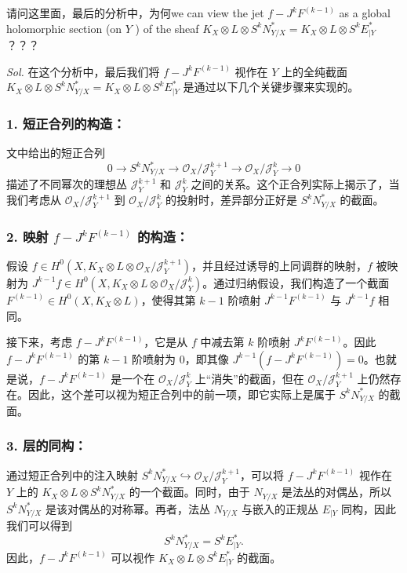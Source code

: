 \documentclass[lang=cn,zihao=5,twoside,fontset=none]{textbook}
\begin{document}
请问这里面，最后的分析中，为何we can view the jet $f-J^k F^{(k-1)}$ as a global holomorphic section (on $Y$ ) of the sheaf $K_X \otimes L \otimes S^k N_{Y / X}^*=K_X \otimes L \otimes S^k E_{\mid Y}^*$？？？

\textit{ Sol. } 在这个分析中，最后我们将 $f - J^k F^{(k-1)}$ 视作在 $Y$ 上的全纯截面 $K_X \otimes L \otimes S^k N_{Y/X}^* = K_X \otimes L \otimes S^k E_{\mid Y}^*$ 是通过以下几个关键步骤来实现的。

\subsubsection{1. 短正合列的构造：}
文中给出的短正合列
\[
0 \longrightarrow S^k N_{Y/X}^* \longrightarrow \mathcal{O}_X / \mathcal{J}_Y^{k+1} \longrightarrow \mathcal{O}_X / \mathcal{J}_Y^k \longrightarrow 0
\]
描述了不同幂次的理想丛 $\mathcal{J}_Y^{k+1}$ 和 $\mathcal{J}_Y^k$ 之间的关系。这个正合列实际上揭示了，当我们考虑从 $\mathcal{O}_X / \mathcal{J}_Y^{k+1}$ 到 $\mathcal{O}_X / \mathcal{J}_Y^k$ 的投射时，差异部分正好是 $S^k N_{Y/X}^*$ 的截面。

\subsubsection{2. 映射 $f - J^k F^{(k-1)}$ 的构造：}
假设 $f \in H^0(X, K_X \otimes L \otimes \mathcal{O}_X / \mathcal{J}_Y^{k+1})$，并且经过诱导的上同调群的映射，$f$ 被映射为 $J^{k-1} f \in H^0(X, K_X \otimes L \otimes \mathcal{O}_X / \mathcal{J}_Y^k)$。通过归纳假设，我们构造了一个截面 $F^{(k-1)} \in H^0(X, K_X \otimes L)$，使得其第 $k-1$ 阶喷射 $J^{k-1} F^{(k-1)}$ 与 $J^{k-1} f$ 相同。

接下来，考虑 $f - J^k F^{(k-1)}$，它是从 $f$ 中减去第 $k$ 阶喷射 $J^k F^{(k-1)}$。因此 $f - J^k F^{(k-1)}$ 的第 $k-1$ 阶喷射为 0，即其像 $J^{k-1}(f - J^k F^{(k-1)}) = 0$。也就是说，$f - J^k F^{(k-1)}$ 是一个在 $\mathcal{O}_X / \mathcal{J}_Y^k$ 上“消失”的截面，但在 $\mathcal{O}_X / \mathcal{J}_Y^{k+1}$ 上仍然存在。因此，这个差可以视为短正合列中的前一项，即它实际上是属于 $S^k N_{Y/X}^*$ 的截面。

\subsubsection{3. 层的同构：}
通过短正合列中的注入映射 $S^k N_{Y/X}^* \hookrightarrow \mathcal{O}_X / \mathcal{J}_Y^{k+1}$，可以将 $f - J^k F^{(k-1)}$ 视作在 $Y$ 上的 $K_X \otimes L \otimes S^k N_{Y/X}^*$ 的一个截面。同时，由于 $N_{Y/X}$ 是法丛的对偶丛，所以 $S^k N_{Y/X}^*$ 是该对偶丛的对称幂。再者，法丛 $N_{Y/X}$ 与嵌入的正规丛 $E_{\mid Y}$ 同构，因此我们可以得到
\[
S^k N_{Y/X}^* = S^k E_{\mid Y}^*.
\]
因此，$f - J^k F^{(k-1)}$ 可以视作 $K_X \otimes L \otimes S^k E_{\mid Y}^*$ 的截面。
\end{document}
